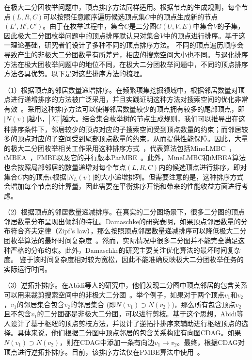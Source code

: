 


在极大二分团枚举问题中，顶点排序方法同样适用。根据节点的生成规则，每个节点$(L,R,C)$可以按照任意顺序遍历候选顶点集$C$中的顶点生成新的节点$(L',R',C')$。由于在枚举过程中，集合$C$是二分图$G(U,V,E)$中集合$V$的子集，因此极大二分团枚举问题中的顶点排序默认只对集合$V$中的顶点进行排序。基于这一理论基础，研究者们设计了多种不同的顶点排序方法。
不同的顶点遍历顺序会导致产生的非极大二分团数量有所差异，相应的搜索空间大小也不同。与退化排序方法在极大团枚举问题中的地位不同，在极大二分团枚举问题中，不同的顶点排序方法各具优势。以下是对这些排序方法的梳理。

（1）根据顶点的邻居数量递增排序。在频繁项集挖掘领域中，根据邻居数量对顶点进行递增排序的方法被广泛采用，并且实践证明这种方法对搜索空间的优化非常有效~\cite{lcm04}。采用这种排序方法可以使得邻居数量较少的顶点拥有较多的尾部顶点，即$|N(v)|$越小，$|X_v^+|$越大。结合集合枚举树的节点生成规则，我们可以推导出在这种排序条件下，邻居较少的顶点对应的子搜索空间受到顶点数量的约束；而邻居较多的顶点对应的子空间受到尾部顶点数量的约束，从而提供性能保障。因此，大量的极大二分团枚举相关工作采用这种排序方式~\cite{lcmmbc07,minel06,iMBEA14,mapreduceMBE16,parMBE19,MEB20}，代表算法包括MineLMBC~\cite{minel06}，iMBEA~\cite{iMBEA14}，FMBE以及它的并行版本ParMBE~\cite{parMBE19}。此外，MineLMBC和iMBEA算法也会按照局部邻居的数量递增对每个节点$(L,R,C)$内的候选顶点进行排序，即对集合$C$内的顶点$v$根据$|N_L(v)|$的大小递增排列。但需要注意的是，这种排序方式会增加每个节点的计算量，因此需要在平衡排序开销和带来的性能收益方面进行考虑。

（2）根据顶点的邻居数量递减排序。在真实的二分图场景下，很多二分图的顶点邻居数量分布呈现出倾斜的特征。Damaschke的研究表明，如果顶点邻居数量的分布符合齐夫定律（Zipf's law），那么按照顶点邻居数量递减排序可以降低极大二分团枚举算法的最坏时间复杂度~\cite{Damaschke14}。然而，实际情况中很多二分图并不能完全满足这种严格的分布约束。此外，Damaschke的研究主要关注优化算法的最坏时间复杂度。
鉴于该时间复杂度相对较为宽松，因此不能准确反映极大二分团枚举任务的实际运行时间。


（3）逆拓扑排序。在Abidi等人的研究中，他们发现二分图中顶点邻居的包含关系可以用来裁剪搜索空间中的非极大二分团~\cite{PMBE20}。举个例子，如果对于两个顶点$v_1$和$v_2$，$v_1$的邻居集合包含$v_2$的邻居集合 (即$N(v_1)\supset N(v_2)$)，那么所有包含顶点$v_2$且不包含$v_1$的二分团都是非极大二分团，可以进行剪枝。基于这个思想，Abidi等人设计了基于枢纽的顶点剪枝方法，并设计了逆拓扑排序来辅助进行枢纽顶点的选择。具体来说，他们根据二分图中顶点邻居的包含关系构建有向图CDAG。如果$N(v_1)\supset N(v_2)$，则在CDAG中添加一条有向边$v_1\rightarrow v_2$。最终，根据CDAG对顶点进行逆拓扑排序。目前，该排序方法仅在PMBE算法中使用~\cite{PMBE20}。

